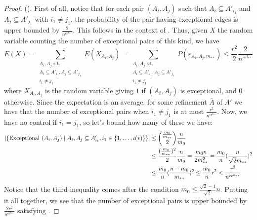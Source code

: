 \begin{lemma}[Claim 4.14]
\begin{proof}
            ().
            First of all, notice that for each pair $(A_i, A_j)$ such that $A_i \subseteq A'_{i_1}$ and
            $A_j \subseteq A'_{j_1}$ with $i_1 \neq j_1$, the probability of the pair having exceptional edges is
            upper bounded by $\frac{2}{n^{c\epsilon^{k_{**}}}}$.
            This follows  in the context of
            .
            Thus, given $X$ the random variable counting the number of exceptional pairs of this kind, we have
            \[
                E(X) = \sum_{\substack{A_i,A_j \text{ s.t.}\\A_i\subseteq A'_{i_1},A_j\subseteq A'_{j_1}\\i_1\neq j_1}} E(X_{A_i, A_j})
                     = \sum_{\substack{A_i,A_j \text{ s.t.}\\A_i\subseteq A'_{i_1},A_j\subseteq A'_{j_1}\\i_1\neq j_1}} P(\varepsilon_{A_i, A_j,m_{**}})
                     \leq \frac{r^2}{2} \frac{2}{n^{c\epsilon^{k_{**}}}}
            \]
            where $X_{A_i,A_j}$ is the random variable giving $1$ if $(A_i, A_j)$ is exceptional, and $0$ otherwise.
            Since the expectation is an average, for some refinement $\overline{A}$ of $\overline{A'}$ we have that
            the number of exceptional pairs when $i_1 \neq j_1$ is at most $\frac{r^2}{n^{c\epsilon^{k_{**}}}}$.
            Now, we have no control if $i_1 = j_1$, so let's bound how many of these we have:
            \[
                \begin{split}
                    |\{ \text{Exceptional } (A_i, A_j) \mid A_i, A_j \subseteq A'_{i_1}, i_1 \in \{ 1, \dots, i(*) \} \}|
                        & \leq {\frac{m_0}{m_{**}} \choose 2} \frac{n}{m_0} \\
                        & \leq \frac{( \frac{m_0}{m_{**}} )^2}{2} \frac{n}{m_0}
                            = \frac{m_0 n}{2 m_{**}^2}
                            = \frac{m_0}{n} ( \frac{n}{\sqrt{2}m_{**}} )^2 \\
                        & \leq \frac{m_0}{n} ( \frac{n - m_0}{m_{**}} )^2
                            \leq \frac{m_0}{n} r^2
                            < \frac{r^2}{n^{c \epsilon^{k_{**}}}}
                \end{split}
            \]
            Notice that the third inequality comes after the condition $m_0 \leq \frac{\sqrt{2}-1}{\sqrt{2}} n$.
            Putting it all together, we see that the number of exceptional pairs is upper bounded by
                $\frac{2r^2}{n^{c\epsilon^{k_{**}}}}$ satisfying .
        \end{proof}
    \end{lemma}

